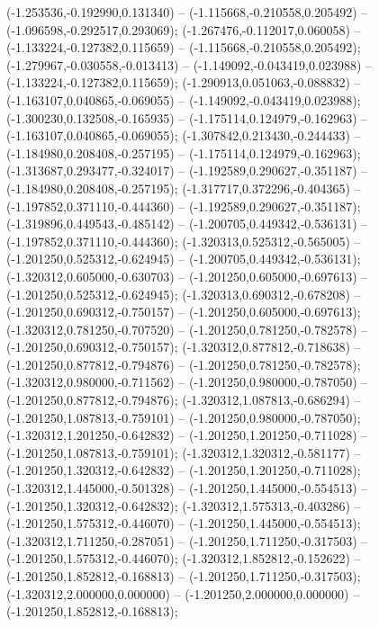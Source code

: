  (-1.253536,-0.192990,0.131340) -- (-1.115668,-0.210558,0.205492) -- (-1.096598,-0.292517,0.293069);
 (-1.267476,-0.112017,0.060058) -- (-1.133224,-0.127382,0.115659) -- (-1.115668,-0.210558,0.205492);
 (-1.279967,-0.030558,-0.013413) -- (-1.149092,-0.043419,0.023988) -- (-1.133224,-0.127382,0.115659);
 (-1.290913,0.051063,-0.088832) -- (-1.163107,0.040865,-0.069055) -- (-1.149092,-0.043419,0.023988);
 (-1.300230,0.132508,-0.165935) -- (-1.175114,0.124979,-0.162963) -- (-1.163107,0.040865,-0.069055);
 (-1.307842,0.213430,-0.244433) -- (-1.184980,0.208408,-0.257195) -- (-1.175114,0.124979,-0.162963);
 (-1.313687,0.293477,-0.324017) -- (-1.192589,0.290627,-0.351187) -- (-1.184980,0.208408,-0.257195);
 (-1.317717,0.372296,-0.404365) -- (-1.197852,0.371110,-0.444360) -- (-1.192589,0.290627,-0.351187);
 (-1.319896,0.449543,-0.485142) -- (-1.200705,0.449342,-0.536131) -- (-1.197852,0.371110,-0.444360);
 (-1.320313,0.525312,-0.565005) -- (-1.201250,0.525312,-0.624945) -- (-1.200705,0.449342,-0.536131);
 (-1.320312,0.605000,-0.630703) -- (-1.201250,0.605000,-0.697613) -- (-1.201250,0.525312,-0.624945);
 (-1.320313,0.690312,-0.678208) -- (-1.201250,0.690312,-0.750157) -- (-1.201250,0.605000,-0.697613);
 (-1.320312,0.781250,-0.707520) -- (-1.201250,0.781250,-0.782578) -- (-1.201250,0.690312,-0.750157);
 (-1.320312,0.877812,-0.718638) -- (-1.201250,0.877812,-0.794876) -- (-1.201250,0.781250,-0.782578);
 (-1.320312,0.980000,-0.711562) -- (-1.201250,0.980000,-0.787050) -- (-1.201250,0.877812,-0.794876);
 (-1.320312,1.087813,-0.686294) -- (-1.201250,1.087813,-0.759101) -- (-1.201250,0.980000,-0.787050);
 (-1.320312,1.201250,-0.642832) -- (-1.201250,1.201250,-0.711028) -- (-1.201250,1.087813,-0.759101);
 (-1.320312,1.320312,-0.581177) -- (-1.201250,1.320312,-0.642832) -- (-1.201250,1.201250,-0.711028);
 (-1.320312,1.445000,-0.501328) -- (-1.201250,1.445000,-0.554513) -- (-1.201250,1.320312,-0.642832);
 (-1.320312,1.575313,-0.403286) -- (-1.201250,1.575312,-0.446070) -- (-1.201250,1.445000,-0.554513);
 (-1.320312,1.711250,-0.287051) -- (-1.201250,1.711250,-0.317503) -- (-1.201250,1.575312,-0.446070);
 (-1.320312,1.852812,-0.152622) -- (-1.201250,1.852812,-0.168813) -- (-1.201250,1.711250,-0.317503);
 (-1.320312,2.000000,0.000000) -- (-1.201250,2.000000,0.000000) -- (-1.201250,1.852812,-0.168813);
